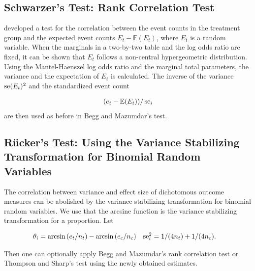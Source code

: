 \documentclass[11pt,a4paper,twoside]{book}\usepackage[]{graphicx}\usepackage[]{color}
\begin{document}
\subsection{Schwarzer's Test: Rank Correlation Test} \label{sec:Schwarzer}
\citet{Schwarzer} developed a test for the correlation between the event counts in the treatment group and the expected event counts $E_t - \mathbb{E}(E_t)$, where $E_t$ is a random variable. When the marginals in a two-by-two table and the log odds ratio are fixed, it can be shown that $E_t$ follows a non-central hypergeometric distribution. Using the Mantel-Haenszel log odds ratio and the marginal total parameters, the variance and the expectation of $E_t$ is calculated. The inverse of the variance $\operatorname{se}(E_t)^2$ and the standardized event count

\begin{align}
(e_t - \mathbb{E}(E_t))/\operatorname{se}_i
\end{align}
are then used as before in Begg and Mazumdar's test.

\subsection{R\"ucker's Test: Using the Variance Stabilizing Transformation for Binomial Random Variables} \label{sec:Rucker}
The correlation between variance and effect size of dichotomous outcome measures can be abolished by the variance stabilizing transformation for binomial random variables. We use that the arcsine function is the variance stabilizing transformation for a proportion. Let

\begin{align}
\theta_i &= \arcsin{(e_t/n_t)} - \arcsin{(e_c/n_c)} \nonumber &
\operatorname{se}_i^2 &= 1/(4n_t) + 1/(4n_c). \nonumber
\end{align}

Then one can optionally apply Begg and Mazumdar's rank correlation test or Thompson and Sharp's test using the newly obtained estimates.
\end{document}
